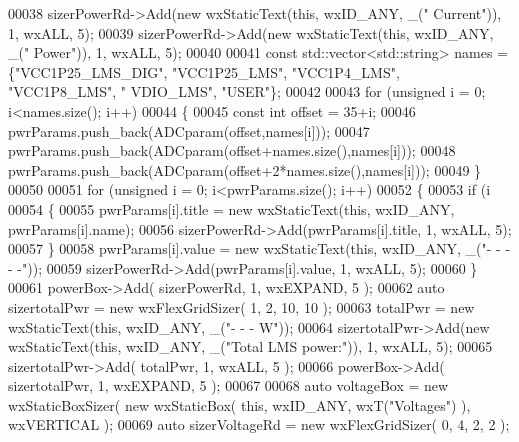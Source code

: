 \begin{DoxyCode}
00038     sizerPowerRd->Add(\textcolor{keyword}{new} wxStaticText(\textcolor{keyword}{this}, wxID\_ANY, \_(\textcolor{stringliteral}{" Current"})), 1, wxALL, 5);
00039     sizerPowerRd->Add(\textcolor{keyword}{new} wxStaticText(\textcolor{keyword}{this}, wxID\_ANY, \_(\textcolor{stringliteral}{" Power"})), 1, wxALL, 5);
00040 
00041     \textcolor{keyword}{const} std::vector<std::string> names = \{\textcolor{stringliteral}{"VCC1P25\_LMS\_DIG"}, \textcolor{stringliteral}{"VCC1P25\_LMS"}, \textcolor{stringliteral}{"VCC1P4\_LMS"}, \textcolor{stringliteral}{"VCC1P8\_LMS"}, \textcolor{stringliteral}{"
      VDIO\_LMS"}, \textcolor{stringliteral}{"USER"}\};
00042 
00043     \textcolor{keywordflow}{for} (\textcolor{keywordtype}{unsigned} i = 0; i<names.size(); i++)
00044     \{
00045         \textcolor{keyword}{const} \textcolor{keywordtype}{int} offset = 35+i;
00046         pwrParams.push\_back(ADCparam(offset,names[i]));
00047         pwrParams.push\_back(ADCparam(offset+names.size(),names[i]));
00048         pwrParams.push\_back(ADCparam(offset+2*names.size(),names[i]));
00049     \}
00050 
00051     \textcolor{keywordflow}{for} (\textcolor{keywordtype}{unsigned} i = 0; i<pwrParams.size(); i++)
00052     \{
00053         \textcolor{keywordflow}{if} (i%
00054         \{
00055             pwrParams[i].title = \textcolor{keyword}{new} wxStaticText(\textcolor{keyword}{this}, wxID\_ANY, pwrParams[i].name);
00056             sizerPowerRd->Add(pwrParams[i].title, 1, wxALL, 5);
00057         \}
00058         pwrParams[i].value = \textcolor{keyword}{new} wxStaticText(\textcolor{keyword}{this}, wxID\_ANY, \_(\textcolor{stringliteral}{"- - - - -"}));
00059         sizerPowerRd->Add(pwrParams[i].value, 1, wxALL, 5);
00060     \}
00061     powerBox->Add( sizerPowerRd, 1, wxEXPAND, 5 );
00062     \textcolor{keyword}{auto} sizertotalPwr = \textcolor{keyword}{new} wxFlexGridSizer( 1, 2, 10, 10 );
00063     totalPwr = \textcolor{keyword}{new} wxStaticText(\textcolor{keyword}{this}, wxID\_ANY, \_(\textcolor{stringliteral}{"- - - W"}));
00064     sizertotalPwr->Add(\textcolor{keyword}{new} wxStaticText(\textcolor{keyword}{this}, wxID\_ANY, \_(\textcolor{stringliteral}{"Total LMS power:"})), 1, wxALL, 5);
00065     sizertotalPwr->Add( totalPwr, 1, wxALL, 5 );
00066     powerBox->Add( sizertotalPwr, 1, wxEXPAND, 5 );
00067 
00068     \textcolor{keyword}{auto} voltageBox = \textcolor{keyword}{new} wxStaticBoxSizer( \textcolor{keyword}{new} wxStaticBox( \textcolor{keyword}{this}, wxID\_ANY, wxT(\textcolor{stringliteral}{"Voltages"}) ), wxVERTICAL 
      );
00069     \textcolor{keyword}{auto} sizerVoltageRd = \textcolor{keyword}{new} wxFlexGridSizer( 0, 4, 2, 2 );

\end{DoxyCode}

